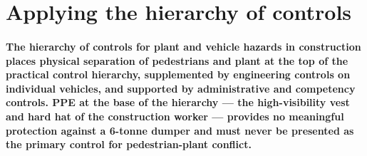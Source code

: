 \section{Applying the hierarchy of controls}

\paragraph{The hierarchy of controls for plant and vehicle hazards in construction places physical separation of pedestrians and plant at the top of the practical control hierarchy, supplemented by engineering controls on individual vehicles, and supported by administrative and competency controls. PPE at the base of the hierarchy --- the high-visibility vest and hard hat of the construction worker --- provides no meaningful protection against a 6-tonne dumper and must never be presented as the primary control for pedestrian-plant conflict.}

